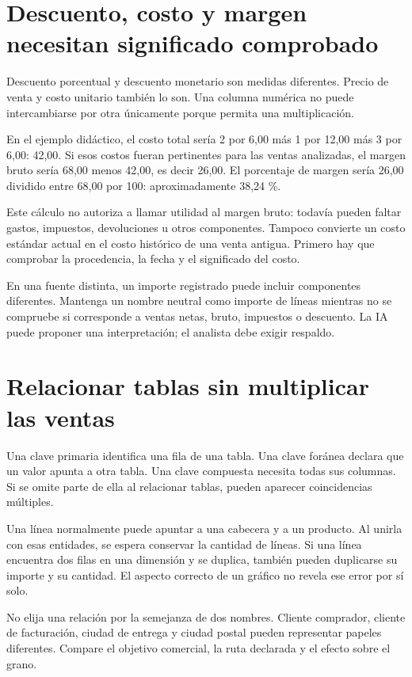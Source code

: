 \section{Descuento, costo y margen necesitan significado comprobado}
Descuento porcentual y descuento monetario son medidas diferentes. Precio de venta y costo unitario también lo son. Una columna numérica no puede intercambiarse por otra únicamente porque permita una multiplicación.

En el ejemplo didáctico, el costo total sería 2 por 6,00 más 1 por 12,00 más 3 por 6,00: 42,00. Si esos costos fueran pertinentes para las ventas analizadas, el margen bruto sería 68,00 menos 42,00, es decir 26,00. El porcentaje de margen sería 26,00 dividido entre 68,00 por 100: aproximadamente 38,24 \%.

Este cálculo no autoriza a llamar utilidad al margen bruto: todavía pueden faltar gastos, impuestos, devoluciones u otros componentes. Tampoco convierte un costo estándar actual en el costo histórico de una venta antigua. Primero hay que comprobar la procedencia, la fecha y el significado del costo.

En una fuente distinta, un importe registrado puede incluir componentes diferentes. Mantenga un nombre neutral como importe de líneas mientras no se compruebe si corresponde a ventas netas, bruto, impuestos o descuento. La IA puede proponer una interpretación; el analista debe exigir respaldo.

\section{Relacionar tablas sin multiplicar las ventas}
Una clave primaria identifica una fila de una tabla. Una clave foránea declara que un valor apunta a otra tabla. Una clave compuesta necesita todas sus columnas. Si se omite parte de ella al relacionar tablas, pueden aparecer coincidencias múltiples.

Una línea normalmente puede apuntar a una cabecera y a un producto. Al unirla con esas entidades, se espera conservar la cantidad de líneas. Si una línea encuentra dos filas en una dimensión y se duplica, también pueden duplicarse su importe y su cantidad. El aspecto correcto de un gráfico no revela ese error por sí solo.

No elija una relación por la semejanza de dos nombres. Cliente comprador, cliente de facturación, ciudad de entrega y ciudad postal pueden representar papeles diferentes. Compare el objetivo comercial, la ruta declarada y el efecto sobre el grano.

